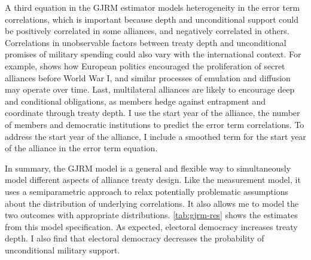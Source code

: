 \documentclass[12pt]{article}
\begin{document}
A third equation in the GJRM estimator models heterogeneity in the error term correlations, which is important because depth and unconditional support could be positively correlated in some alliances, and negatively correlated in others. 
Correlations in unobservable factors between treaty depth and unconditional promises of military spending could also vary with the international context.
For example, \citet{Kuo2019} shows how European politics encouraged the proliferation of secret alliances before World War I, and similar processes of emulation and diffusion may operate over time.
Last, multilateral alliances are likely to encourage deep and conditional obligations, as members hedge against entrapment and coordinate through treaty depth. 
I use the start year of the alliance, the number of members and democratic institutions to predict the error term correlations.
To address the start year of the alliance, I include a smoothed term for the start year of the alliance in the error term equation.  


In summary, the GJRM model is a general and flexible way to simultaneously model different aspects of alliance treaty design.
Like the measurement model, it uses a semiparametric approach to relax potentially problematic assumptions about the distribution of underlying correlations. 
It also allows me to model the two outcomes with appropriate distributions. 
\autoref{tab:gjrm-res} shows the estimates from this model specification. 
As expected, electoral democracy increases treaty depth.
I also find that electoral democracy decreases the probability of unconditional military support. 
\end{document}
